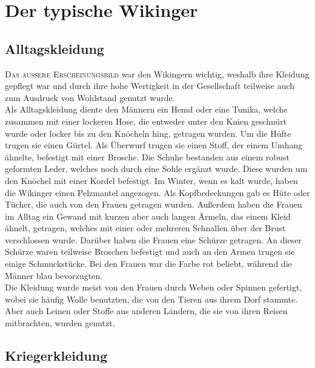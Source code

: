 \documentclass[12pt,a4paper,ngerman,openany]{book}
\newcommand{\flettrine}[2]{\lettrine[lines=2, depth=0, loversize=0.25, nindent=0.69pt, lraise=0.15]{\initfamily{#1}}{#2}}
\newcommand*\initfamily{\usefont{U}{GotIn}{xl}{n}}
\newcommand{\fchapter}[1]{\chapter{#1}\thispagestyle{chapterstyle}}
\begin{document}
\fchapter{Der typische Wikinger}


\section{Alltagskleidung}
\flettrine{D}{Das äussere Erscheinungsbild} war den Wikingern wichtig, weshalb ihre Kleidung gepflegt war und durch ihre hohe Wertigkeit in der Gesellschaft teilweise auch zum Ausdruck von Wohlstand genutzt wurde.\\
Als Alltagskleidung diente den Männern ein Hemd oder eine Tunika, welche zusammen mit einer lockeren Hose, die entweder unter den Knien geschnürt wurde oder locker bis zu den Knöcheln hing, getragen wurden. Um die Hüfte trugen sie einen Gürtel. Als Überwurf trugen sie einen Stoff, der einem Umhang ähnelte, befestigt mit einer Brosche. Die Schuhe bestanden aus einem robust geformten Leder, welches noch durch eine Sohle ergänzt wurde. Diese wurden um den Knöchel mit einer Kordel befestigt. Im Winter, wenn es kalt wurde, haben die Wikinger einen Pelzmantel angezogen. Als Kopfbedeckungen gab es Hüte oder Tücher, die auch von den Frauen getragen wurden. 
Außerdem haben die Frauen im Alltag ein Gewand mit kurzen aber auch langen Ärmeln, das einem Kleid ähnelt, getragen, welches mit einer oder mehreren Schnallen über der Brust verschlossen wurde. Darüber haben die Frauen eine Schürze getragen. An dieser Schürze waren teilweise Broschen befestigt und auch an den Armen trugen sie einige Schmuckstücke. Bei den Frauen war die Farbe rot beliebt, während die Männer blau bevorzugten.\\
Die Kleidung wurde meist von den Frauen durch Weben oder Spinnen gefertigt, wobei sie häufig Wolle benutzten, die von den Tieren aus ihrem Dorf stammte. Aber auch Leinen oder Stoffe aus anderen Ländern, die sie von ihren Reisen mitbrachten, wurden genutzt.

\section{Kriegerkleidung}

\end{document}
